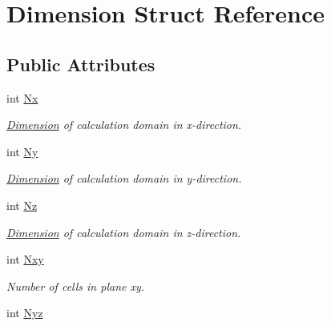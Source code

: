 \hypertarget{struct_dimension}{}\section{Dimension Struct Reference}
\label{struct_dimension}
\subsection*{Public Attributes}
\begin{DoxyCompactItemize}
\item 
\hypertarget{struct_dimension_aaeed6b784beae7ca3656e49004fb3172}{}int \hyperlink{struct_dimension_aaeed6b784beae7ca3656e49004fb3172}{Nx}\label{struct_dimension_aaeed6b784beae7ca3656e49004fb3172}

\begin{DoxyCompactList}\small\item\em \hyperlink{struct_dimension}{Dimension} of calculation domain in x-\/direction. \end{DoxyCompactList}\item 
\hypertarget{struct_dimension_ace60592c5ec4dbcf6377d5eae894da1e}{}int \hyperlink{struct_dimension_ace60592c5ec4dbcf6377d5eae894da1e}{Ny}\label{struct_dimension_ace60592c5ec4dbcf6377d5eae894da1e}

\begin{DoxyCompactList}\small\item\em \hyperlink{struct_dimension}{Dimension} of calculation domain in y-\/direction. \end{DoxyCompactList}\item 
\hypertarget{struct_dimension_ae60f153abbfff1b84c30e44d75713507}{}int \hyperlink{struct_dimension_ae60f153abbfff1b84c30e44d75713507}{Nz}\label{struct_dimension_ae60f153abbfff1b84c30e44d75713507}

\begin{DoxyCompactList}\small\item\em \hyperlink{struct_dimension}{Dimension} of calculation domain in z-\/direction. \end{DoxyCompactList}\item 
\hypertarget{struct_dimension_af3ce619f3d9b6df607d21ffa3d1ceefb}{}int \hyperlink{struct_dimension_af3ce619f3d9b6df607d21ffa3d1ceefb}{Nxy}\label{struct_dimension_af3ce619f3d9b6df607d21ffa3d1ceefb}

\begin{DoxyCompactList}\small\item\em Number of cells in plane xy. \end{DoxyCompactList}\item 
\hypertarget{struct_dimension_a1481aeadfbcbe8c6152dd80736f0fba6}{}int \hyperlink{struct_dimension_a1481aeadfbcbe8c6152dd80736f0fba6}{Nyz}\label{struct_dimension_a1481aeadfbcbe8c6152dd80736f0fba6}


\end{DoxyCompactItemize}
